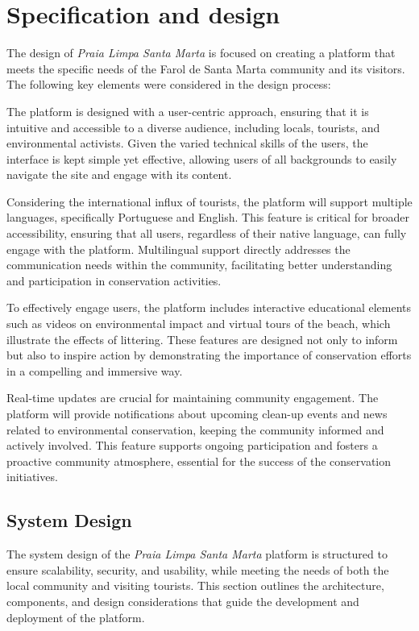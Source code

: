 \chapter{Specification and design}
\label{ch:specification}

The design of \textit{Praia Limpa Santa Marta} is focused on creating a platform that meets the specific needs of the Farol de Santa Marta community and its visitors. The following key elements were considered in the design process:


The platform is designed with a user-centric approach, ensuring that it is intuitive and accessible to a diverse audience, including locals, tourists, and environmental activists. Given the varied technical skills of the users, the interface is kept simple yet effective, allowing users of all backgrounds to easily navigate the site and engage with its content.

Considering the international influx of tourists, the platform will support multiple languages, specifically Portuguese and English. This feature is critical for broader accessibility, ensuring that all users, regardless of their native language, can fully engage with the platform. Multilingual support directly addresses the communication needs within the community, facilitating better understanding and participation in conservation activities.

To effectively engage users, the platform includes interactive educational elements such as videos on environmental impact and virtual tours of the beach, which illustrate the effects of littering. These features are designed not only to inform but also to inspire action by demonstrating the importance of conservation efforts in a compelling and immersive way.

Real-time updates are crucial for maintaining community engagement. The platform will provide notifications about upcoming clean-up events and news related to environmental conservation, keeping the community informed and actively involved. This feature supports ongoing participation and fosters a proactive community atmosphere, essential for the success of the conservation initiatives.

\section{System Design}

The system design of the \textit{Praia Limpa Santa Marta} platform is structured to ensure scalability, security, and usability, while meeting the needs of both the local community and visiting tourists. This section outlines the architecture, components, and design considerations that guide the development and deployment of the platform.

